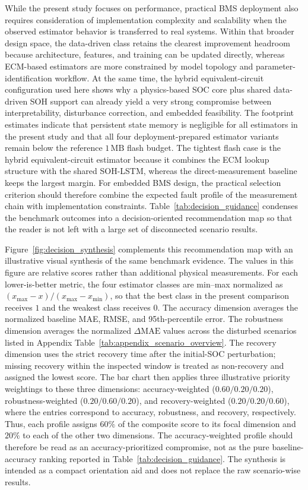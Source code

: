 \documentclass[review,nopreprintline]{elsarticle}
\begin{document}
While the present study focuses on performance, practical BMS deployment also requires consideration of implementation complexity and scalability when the observed estimator behavior is transferred to real systems. Within that broader design space, the data-driven class retains the clearest improvement headroom because architecture, features, and training can be updated directly, whereas ECM-based estimators are more constrained by model topology and parameter-identification workflow. At the same time, the hybrid equivalent-circuit configuration used here shows why a physics-based SOC core plus shared data-driven SOH support can already yield a very strong compromise between interpretability, disturbance correction, and embedded feasibility. The footprint estimates indicate that persistent state memory is negligible for all estimators in the present study and that all four deployment-prepared estimator variants remain below the reference $1\,\mathrm{MB}$ flash budget. The tightest flash case is the hybrid equivalent-circuit estimator because it combines the ECM lookup structure with the shared SOH-LSTM, whereas the direct-measurement baseline keeps the largest margin. For embedded BMS design, the practical selection criterion should therefore combine the expected fault profile of the measurement chain with implementation constraints. Table~\ref{tab:decision_guidance} condenses the benchmark outcomes into a decision-oriented recommendation map so that the reader is not left with a large set of disconnected scenario results.

Figure~\ref{fig:decision_synthesis} complements this recommendation map with an illustrative visual synthesis of the same benchmark evidence. The values in this figure are relative scores rather than additional physical measurements. For each lower-is-better metric, the four estimator classes are min--max normalized as $(x_{\max}-x)/(x_{\max}-x_{\min})$, so that the best class in the present comparison receives $1$ and the weakest class receives $0$. The accuracy dimension averages the normalized baseline MAE, RMSE, and 95th-percentile error. The robustness dimension averages the normalized $\Delta\mathrm{MAE}$ values across the disturbed scenarios listed in Appendix Table~\ref{tab:appendix_scenario_overview}. The recovery dimension uses the strict recovery time after the initial-SOC perturbation; missing recovery within the inspected window is treated as non-recovery and assigned the lowest score. The bar chart then applies three illustrative priority weightings to these three dimensions: accuracy-weighted ($0.60/0.20/0.20$), robustness-weighted ($0.20/0.60/0.20$), and recovery-weighted ($0.20/0.20/0.60$), where the entries correspond to accuracy, robustness, and recovery, respectively. Thus, each profile assigns $60\%$ of the composite score to its focal dimension and $20\%$ to each of the other two dimensions. The accuracy-weighted profile should therefore be read as an accuracy-prioritized compromise, not as the pure baseline-accuracy ranking reported in Table~\ref{tab:decision_guidance}. The synthesis is intended as a compact orientation aid and does not replace the raw scenario-wise results.
\end{document}

